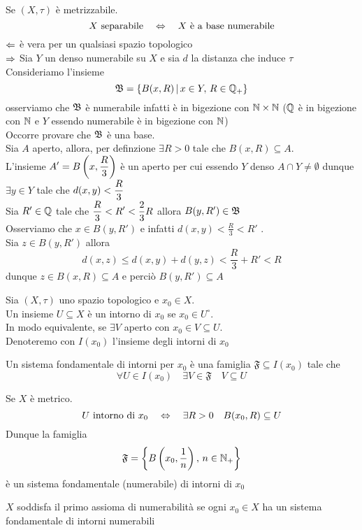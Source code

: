 \begin{prop}Se $(X,\tau)$ \`e metrizzabile.
$$ X \text{ separabile} \quad \Leftrightarrow \quad X \text{ \`e a base numerabile} $$
\proof
$\Leftarrow$ \`e vera per un qualsiasi spazio topologico\\
$\Rightarrow$ Sia $Y$ un denso numerabile su $X$ e sia $d$ la distanza che induce $\tau$\\
Consideriamo l'insieme 
$$ \mathfrak{B}=\{ B(x,R) \, \vert \, x \in Y , \, R \in \mathbb{Q}_+ \}$$ 
osserviamo che $\mathfrak{B}$ \`e numerabile infatti \`e in bigezione con $\mathbb{N} \times \mathbb{N} $ ($\mathbb{Q}$ \`e in bigezione con $\mathbb{N}$ e $Y$ essendo numerabile \`e in bigezione con $\mathbb{N}$)\\
Occorre provare che $\mathfrak{B}$ \`e una base.\\
Sia $A$ aperto, allora, per definzione $\exists R>0$ tale che $B(x,R)\subseteq A$.\\
L'insieme $\displaystyle A'=B\left(x, \frac{R}{3} \right)$ \`e un aperto per cui essendo $Y$ denso  $A\cap Y\neq \emptyset $ dunque $\exists y\in Y$ tale che $\displaystyle d(x,y)<\frac{R}{3}$\\
Sia $R'\in \mathbb{Q}$ tale che $\displaystyle \frac{R}{3}<R' < \frac{2}{3}R $ allora 
$ B(y,R') \in \mathfrak{B} $ \\
Osserviamo che $x\in B(y,R')$ e infatti $d(x,y)< \frac{R}{3}<R'$ .\\
Sia $z\in B(y,R')$ allora
$$ d(x,z) \leq d(x,y)+ d(y,z) < \frac{R}{3}+R' < R $$ dunque
$z\in B(x,R) \subseteq A$ e perci\`o $B(y,R') \subseteq A $
\endproof
\end{prop}
\newpage

\begin{defn}Sia $(X,\tau)$ uno spazio topologico e $x_0\in X$.\\
Un insieme $U\subseteq X$ \`e un intorno di $x_0$ se $x_0\in U^\circ$.\\
In modo equivalente, se $\exists V $ aperto con $x_0 \in V \subseteq U$.\\
Denoteremo con $I(x_0)$ l'insieme degli intorni di $x_0$
\end{defn}

\begin{defn}Un sistema fondamentale di intorni per $x_0$ \`e una famiglia $\mathfrak{F}\subseteq I(x_0)$ tale che $$\forall U \in I(x_0) \quad \exists V \in \mathfrak{F} \quad V \subseteq U$$
\end{defn}
\begin{oss}Se $X$ \`e metrico.
$$ U \text{ intorno di } x_0 \quad \Leftrightarrow \quad \exists R>0 \quad B(x_0, R) \subseteq U $$
Dunque la famiglia
$$\mathfrak{F}=\left\{ B \left(x_0, \frac{1}{n}\right) ,\, n \in \mathbb{N}_+ \right\}$$
\`e un sistema fondamentale (numerabile) di intorni di $x_0$ 
\end{oss}
\spazio
\begin{defn}\bianco$X$ soddisfa il primo assioma di numerabilit\`a se ogni $x_0\in X$ ha un sistema fondamentale di intorni numerabili
\end{defn}

